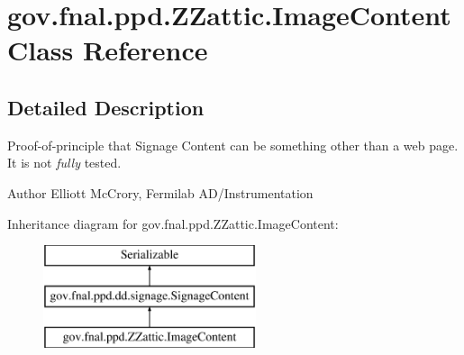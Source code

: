 \hypertarget{classgov_1_1fnal_1_1ppd_1_1ZZattic_1_1ImageContent}{\section{gov.\-fnal.\-ppd.\-Z\-Zattic.\-Image\-Content Class Reference}
\label{classgov_1_1fnal_1_1ppd_1_1ZZattic_1_1ImageContent}
}


\subsection{Detailed Description}
Proof-\/of-\/principle that Signage Content can be something other than a web page. It is not {\itshape fully} tested.

\begin{DoxyAuthor}{Author}
Elliott Mc\-Crory, Fermilab A\-D/\-Instrumentation 
\end{DoxyAuthor}
Inheritance diagram for gov.\-fnal.\-ppd.\-Z\-Zattic.\-Image\-Content\-:\begin{figure}[H]
\begin{center}
\leavevmode
\includegraphics[height=3.000000cm]{classgov_1_1fnal_1_1ppd_1_1ZZattic_1_1ImageContent}
\end{center}
\end{figure}
